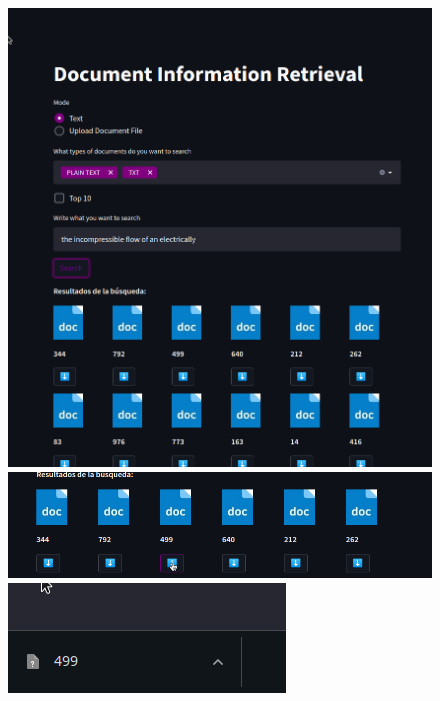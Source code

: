 \documentclass{llncs}
\begin{document}
\begin{figure}
    \includegraphics[scale = .28]{./images/ui_search_result.png}
    \includegraphics[scale = .28]{./images/ui_tex_download.png}
    \includegraphics[scale = .28]{./images/file_downloaded.png}
\end{figure}
\end{document}

